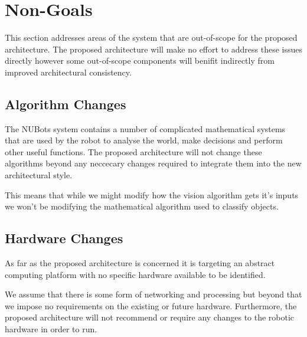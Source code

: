 \documentclass[english,12pt]{scrartcl}
\begin{document}
	\section{Non-Goals}
		This section addresses areas of the system that are out-of-scope for the proposed architecture.
		The proposed architecture will make no effort to address these issues directly however some out-of-scope
		components will benifit indirectly from improved architectural consistency.
		
		\subsection{Algorithm Changes}
			The NUBots system contains a number of complicated mathematical systems that are used by the robot
			to analyse the world, make decisions and perform other useful functions. 
			The proposed architecture will not change these algorithms beyond any neccecary changes required to
			integrate them into the new architectural style.
			
			This means that while we might modify how the vision algorithm gets it's inputs we won't be modifying the
			mathematical algorithm used to classify objects.

		\subsection{Hardware Changes}
			As far as the proposed architecture is concerned it is targeting an abstract computing platform with no specific hardware
			available to be identified. 
			
			We assume that there is some form of networking and processing but beyond that we impose no requirements on the
			existing or future hardware. Furthermore, the proposed architecture will not recommend or require any changes to the robotic
			hardware in order to run.
\end{document}
